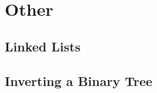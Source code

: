 \section{Other}
\label{coding:other}

\subsection{Linked Lists}
\label{coding:other:lls}

\subsection{Inverting a Binary Tree}
\label{coding:other:binary_tree_inversion}

